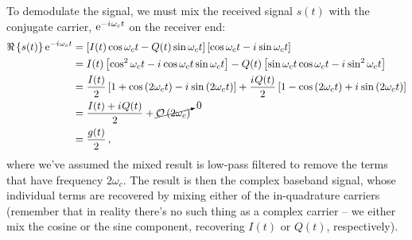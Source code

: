 To demodulate the signal, we must mix the received signal $s(t)$ with the
conjugate carrier, $\mathrm{e}^{-{i\mkern1mu}\omega_c t}$ on the receiver end:
%
\begin{align*}
  \Re\left\{s(t)\right\} \mathrm{e}^{-{i\mkern1mu}\omega_c t} &= \left[
    I(t)\cos\omega_c t - Q(t)\sin\omega_c t
  \right] \left[ \cos\omega_c t - {i\mkern1mu}\sin\omega_c t\right] \\
  &= I(t) \left[\cos^2\omega_c t -{i\mkern1mu}\cos\omega_c t \sin\omega_c t\right] -
    Q(t)\left[ \sin\omega_c t\cos\omega_c t -{i\mkern1mu}\sin^2\omega_c t\right] \\
  &= \frac{I(t)}{2}\left[
    1 + \cos\left(2\omega_c t\right) - {i\mkern1mu}\sin\left(2\omega_c t\right)
  \right] + \frac{{i\mkern1mu} Q(t)}{2}\left[
    1 - \cos\left(2\omega_c t\right) + {i\mkern1mu}\sin\left(2\omega_c t\right) 
  \right] \\
  &= \frac{I(t) + {i\mkern1mu} Q(t)}{2} +
    \cancelto{0}{\mathcal{O}\left( 2\omega_c \right)} \\
  &= \frac{g(t)}{2}\,,
\end{align*}
%
where we've assumed the mixed result is low-pass filtered to remove the terms
that have frequency $2\omega_c$. The result is then the complex baseband signal,
whose individual terms are recovered by mixing either of the in-quadrature
carriers (remember that in reality there's no such thing as a complex carrier --
we either mix the cosine or the sine component, recovering $I(t)$ or $Q(t)$,
respectively).
